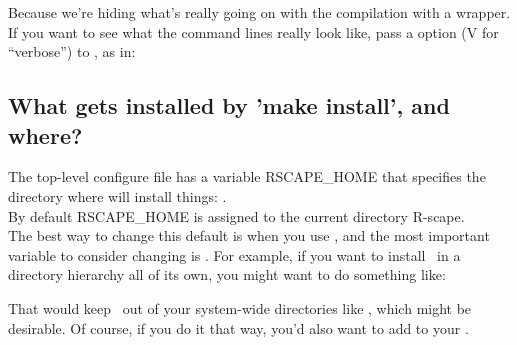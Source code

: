 Because we're hiding what's really going on with the compilation with
a wrapper.  If you want to see what the command lines really look
like, pass a  option (V for ``verbose'') to ,
as in:


\subsection{What gets installed by 'make install', and where?}

The top-level configure file has a variable RSCAPE\_HOME that
specifies the directory where  will install
things: .\\

By default RSCAPE\_HOME is assigned to the current directory
R-scape.\\

The best way to change this default is when you use
, and the most important variable to consider
changing is . For example, if you want to install
\rscape\ in a directory hierarchy all of its own, you might want to do
something like:


That would keep \rscape\ out of your system-wide directories like
, which might be desirable. Of course, if you do
it that way, you'd also want to add  to
your .
